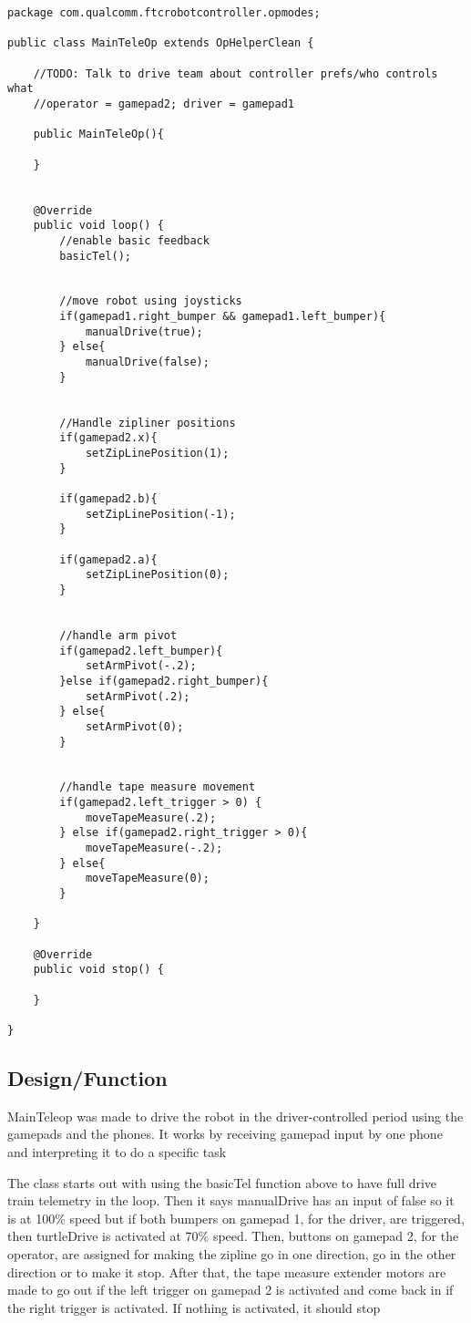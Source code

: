 \documentclass[11pt,fleqn]{article}
\begin{document}
\begin{verbatim}
package com.qualcomm.ftcrobotcontroller.opmodes;

public class MainTeleOp extends OpHelperClean {

    //TODO: Talk to drive team about controller prefs/who controls what
    //operator = gamepad2; driver = gamepad1

    public MainTeleOp(){

    }


    @Override
    public void loop() {
        //enable basic feedback
        basicTel();


        //move robot using joysticks
        if(gamepad1.right_bumper && gamepad1.left_bumper){
            manualDrive(true);
        } else{
            manualDrive(false);
        }


        //Handle zipliner positions
        if(gamepad2.x){
            setZipLinePosition(1);
        }

        if(gamepad2.b){
            setZipLinePosition(-1);
        }

        if(gamepad2.a){
            setZipLinePosition(0);
        }


        //handle arm pivot
        if(gamepad2.left_bumper){
            setArmPivot(-.2);
        }else if(gamepad2.right_bumper){
            setArmPivot(.2);
        } else{
            setArmPivot(0);
        }


        //handle tape measure movement
        if(gamepad2.left_trigger > 0) {
            moveTapeMeasure(.2);
        } else if(gamepad2.right_trigger > 0){
            moveTapeMeasure(-.2);
        } else{
            moveTapeMeasure(0);
        }

    }

    @Override
    public void stop() {

    }

}

\end{verbatim}

\subsection*{Design/Function} 

MainTeleop was made to drive the robot in the driver-controlled period
using the gamepads and the phones. It works by receiving gamepad input by one phone and interpreting
it to do a specific task

The class starts out with using the basicTel function above to have full drive train telemetry in
the loop. Then it says manualDrive has an input of false so it is at 100\% speed but if both bumpers
on gamepad 1, for the driver, are triggered, then turtleDrive is activated at 70\% speed. Then,
buttons on gamepad 2, for the operator, are assigned for making the zipline go in one direction, go
in the other direction or to make it stop. After that, the tape measure extender motors are made to
go out if the left trigger on gamepad 2 is activated and come back in if the right trigger is
activated. If nothing is activated, it should stop
\end{document}
